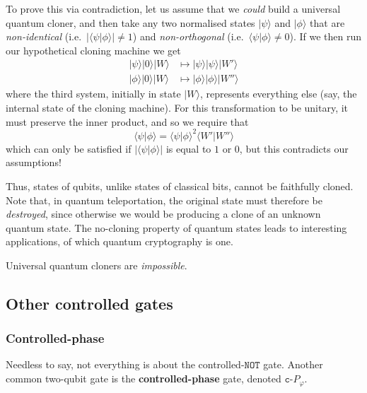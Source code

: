 \documentclass[fleqn]{article}
\newenvironment{idea}{\noindent}{\medskip}
\begin{document}
To prove this via contradiction, let us assume that we \emph{could} build a universal quantum cloner, and then take any two normalised states \(|\psi\rangle\) and \(|\phi\rangle\) that are \emph{non-identical} (i.e.~\(|\langle\psi|\phi\rangle|\neq1\)) and \emph{non-orthogonal} (i.e.~\(\langle\psi|\phi\rangle\neq0\)).
If we then run our hypothetical cloning machine we get
\[
  \begin{aligned}
    |\psi\rangle|0\rangle|W\rangle
    &\mapsto |\psi\rangle|\psi\rangle|W'\rangle
  \\|\phi\rangle|0\rangle|W\rangle
    &\mapsto |\phi\rangle|\phi\rangle|W''\rangle
  \end{aligned}
\]
where the third system, initially in state \(|W\rangle\), represents everything else (say, the internal state of the cloning machine).
For this transformation to be unitary, it must preserve the inner product, and so we require that
\[
  \langle\psi|\phi\rangle
  = \langle\psi|\phi\rangle^2 \langle W'|W''\rangle
\]
which can only be satisfied if \(|\langle\psi|\phi\rangle|\) is equal to \(1\) or \(0\), but this contradicts our assumptions!

Thus, states of qubits, unlike states of classical bits, cannot be faithfully cloned.
Note that, in quantum teleportation, the original state must therefore be \emph{destroyed}, since otherwise we would be producing a clone of an unknown quantum state.
The no-cloning property of quantum states leads to interesting applications, of which quantum cryptography is one.

\begin{idea}
Universal quantum cloners are \emph{impossible}.

\end{idea}

\hypertarget{other-controlled-gates}{%
\subsection{Other controlled gates}\label{other-controlled-gates}}

\hypertarget{controlled-phase}{%
\subsubsection{Controlled-phase}\label{controlled-phase}}

Needless to say, not everything is about the controlled-\(\texttt{NOT}\) gate.
Another common two-qubit gate is the \textbf{controlled-phase} gate, denoted \(\texttt{c-}P_\varphi\).
\end{document}
